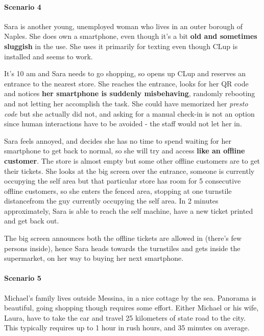 \paragraph{Scenario 4}
Sara is another young, unemployed woman who lives in an outer borough of Naples. She does own a smartphone, even though it's a bit \textbf{old and sometimes sluggish} in the use. She uses it primarily for texting even though CLup is installed and seems to work.

It's 10 am and Sara needs to go shopping, so opens up CLup and reserves an entrance to the nearest store. She reaches the entrance, looks for her QR code and notices \textbf{her smartphone is suddenly misbehaving}, randomly rebooting and not letting her accomplish the task. \newline
She could have memorized her \textit{presto code} but she actually did not, and asking for a manual check-in is not an option since human interactions have to be avoided - the staff would not let her in.

Sara feels annoyed, and decides she has no time to spend waiting for her smartphone to get back to normal, so she will try and access \textbf{like an offline customer}. The store is almost empty but some other offline customers are to get their tickets. \newline
She looks at the big screen over the entrance, someone is currently occupying the self area but that particular store has room for 5 consecutive offline customers, so she enters the fenced area, stopping at \guillemotleft one turnstile distance\guillemotright \space from the guy currently occupying the self area. In 2 minutes approximately, Sara is able to reach the self machine, have a new ticket printed and get back out.

The big screen announces both the offline tickets are allowed in (there's few persons inside), hence Sara heads towards the turnstiles and gets inside the supermarket, on her way to buying her next smartphone.


\paragraph{Scenario 5}

Michael's family lives outside Messina, in a nice cottage by the sea. Panorama is beautiful, going shopping though requires some effort. \newline
Either Michael or his wife, Laura, have to take the car and travel 25 kilometers of state road to the city. This typically requires up to 1 hour in rush hours, and 35 minutes on average.

